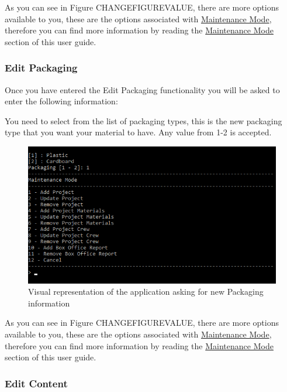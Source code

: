 \documentclass[
  english,
  a4paper,
,tablecaptionabove
]{scrartcl}
\begin{document}
As you can see in Figure CHANGEFIGUREVALUE, there are more options
available to you, these are the options associated with
\protect\hyperlink{using-maintenance-mode}{Maintenance Mode}, therefore
you can find more information by reading the
\protect\hyperlink{using-maintenance-mode}{Maintenance Mode} section of
this user guide.

\newpage

\hypertarget{edit-packaging-1}{%
\subsubsection{Edit Packaging}\label{edit-packaging-1}}

Once you have entered the Edit Packaging functionality you will be asked
to enter the following information:

You need to select from the list of packaging types, this is the new
packaging type that you want your material to have. Any value from 1-2
is accepted.

\begin{figure}
\centering
\includegraphics{images/user-guide/maintenance-mode/update-project-material-packaging.png}
\caption{Visual representation of the application asking for new
Packaging information}
\end{figure}

As you can see in Figure CHANGEFIGUREVALUE, there are more options
available to you, these are the options associated with
\protect\hyperlink{using-maintenance-mode}{Maintenance Mode}, therefore
you can find more information by reading the
\protect\hyperlink{using-maintenance-mode}{Maintenance Mode} section of
this user guide.

\newpage

\hypertarget{edit-content-1}{%
\subsubsection{Edit Content}\label{edit-content-1}}
\end{document}
